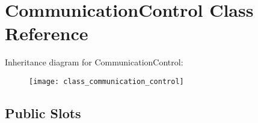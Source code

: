 \hypertarget{class_communication_control}{\section{Communication\-Control Class Reference}
\label{class_communication_control}
}
Inheritance diagram for Communication\-Control\-:\begin{figure}[H]
\begin{center}
\leavevmode
\texttt{[image: class\_communication\_control]}
\end{center}
\end{figure}
\subsection*{Public Slots}
